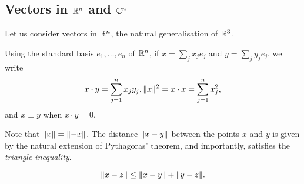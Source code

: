 \documentclass[main.tex]{subfiles}
\begin{document}
		\subsection{Vectors in $\mathbb R^n$ and $\mathbb C^n$}
			Let us consider vectors in $\mathbb R^n$, the natural generalisation of $\mathbb R^3$.
			\begin{definition}
				Using the standard basis $e_1, \ldots, e_n$ of $\mathbb R^n$, if $x = \sum_j x_j e_j$ and $y = \sum_j y_j e_j$, we write
				\begin{equation*}
					x \cdot y = \sum_{j = 1}^{n} x_j y_j, \lVert x\rVert^2 = x \cdot x = \sum_{j = 1}^{n} x^2_j,
				\end{equation*}
				and $x \perp y$ when $x\cdot y = 0$.
			\end{definition}
		Note that $\lVert x\rVert = \lVert-x\rVert$. The distance $\lVert x - y\rVert$ between the points $x$ and $y$ is given by the natural extension of Pythagoras' theorem, and importantly, satisfies the \textit{triangle inequality}.

			\begin{equation}
			\lVert x - z\rVert \leq \lVert x - y\rVert + \lVert y - z\rVert.
			\end{equation}
\end{document}

